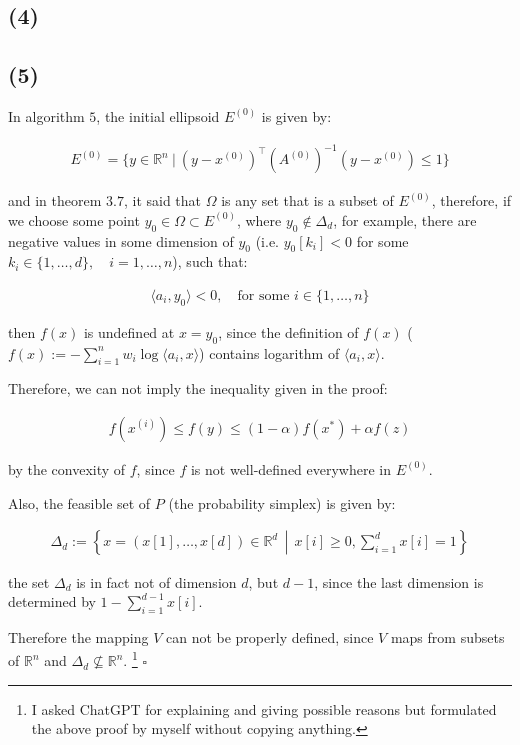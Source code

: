 \documentclass{article}
\begin{document}
\subsection*{(4)}

\subsection*{(5)}

In algorithm $5$, the initial ellipsoid $E^{(0)}$ is given by:

\begin{align*}
    E^{(0)} = \{ y \in \mathbb{R}^n \ | \ (y - x^{(0)})^\intercal (A^{(0)})^{-1} (y - x^{(0)}) \le 1 \}
\end{align*}

and in theorem $3.7$, it said that $\Omega$ is any set that is a subset of $E^{(0)}$,
therefore, if we choose some point $y_0 \in \Omega \subset E^{(0)}$, 
where $y_0 \notin \Delta_d$, for example, there are negative values in some dimension of $y_0$ 
(i.e. $y_0[k_i] < 0$ for some $k_i \in \{1, \ldots, d\}, \quad i = 1, \ldots, n$), such that:

\begin{align*}
    \langle a_i, y_0 \rangle < 0, \quad \text{for some } i \in \{1, \ldots, n\}
\end{align*}

then $f(x)$ is undefined at $x = y_0$,
since the definition of $f(x)$ ($f ( x ) := - \sum_{i = 1}^n w_i \log \langle a_i, x \rangle$) contains logarithm of $\langle a_i, x \rangle$.

Therefore, we can not imply the inequality given in the proof:

\begin{align*}
    f(x^{(i)}) \le f(y) \le (1 - \alpha) f(x^*) + \alpha f(z)
\end{align*}

by the convexity of $f$, since $f$ is not well-defined everywhere in $E^{(0)}$.
\bigskip

Also, the feasible set of $P$ (the probability simplex) is given by:

\begin{align*}
    \Delta_d := \left\{ x = ( x[1], \ldots, x[d] ) \in \mathbb{R}^d \, \middle| \, x[i] \geq 0, \sum_{i = 1}^d x[i] = 1 \right\} 
\end{align*}

the set $\Delta_d$ is in fact not of dimension $d$, but $d - 1$, 
since the last dimension is determined by $1 - \sum_{i = 1}^{d - 1} x[i]$.
\bigskip

Therefore the mapping $V$ can not be properly defined,
since $V$ maps from subsets of $\mathbb{R}^n$ and $\Delta_d \not\subseteq \mathbb{R}^n$. 
\footnote{I asked ChatGPT for explaining and giving possible reasons but formulated the above proof by myself without copying anything.}
$\square$
\end{document}
